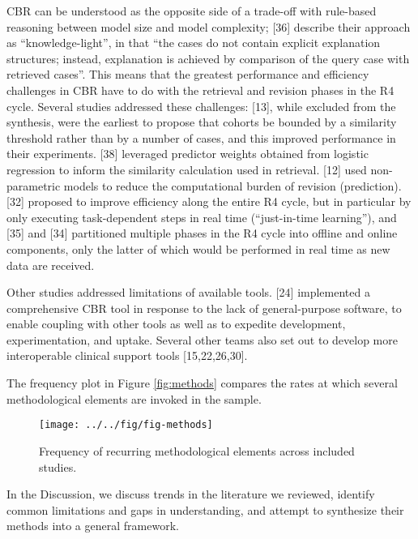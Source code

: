 \documentclass[preprint, 3p,
authoryear]{elsarticle} %
\begin{document}
CBR can be understood as the opposite side of a trade-off with
rule-based reasoning between model size and model complexity; {[}36{]}
describe their approach as ``knowledge-light'', in that ``the cases do
not contain explicit explanation structures; instead, explanation is
achieved by comparison of the query case with retrieved cases''. This
means that the greatest performance and efficiency challenges in CBR
have to do with the retrieval and revision phases in the R4 cycle.
Several studies addressed these challenges: {[}13{]}, while excluded
from the synthesis, were the earliest to propose that cohorts be bounded
by a similarity threshold rather than by a number of cases, and this
improved performance in their experiments. {[}38{]} leveraged predictor
weights obtained from logistic regression to inform the similarity
calculation used in retrieval. {[}12{]} used non-parametric models to
reduce the computational burden of revision (prediction). {[}32{]}
proposed to improve efficiency along the entire R4 cycle, but in
particular by only executing task-dependent steps in real time
(``just-in-time learning''), and {[}35{]} and {[}34{]} partitioned
multiple phases in the R4 cycle into offline and online components, only
the latter of which would be performed in real time as new data are
received.

Other studies addressed limitations of available tools. {[}24{]}
implemented a comprehensive CBR tool in response to the lack of
general-purpose software, to enable coupling with other tools as well as
to expedite development, experimentation, and uptake. Several other
teams also set out to develop more interoperable clinical support tools
{[}15,22,26,30{]}.

The frequency plot in Figure \ref{fig:methods} compares the rates at
which several methodological elements are invoked in the sample.

\begin{figure}

{\centering \texttt{[image: ../../fig/fig-methods]} 

}

\caption{\label{fig:methods}Frequency of recurring methodological elements across included studies.}\label{fig:fig:methods}
\end{figure}

In the Discussion, we discuss trends in the literature we reviewed,
identify common limitations and gaps in understanding, and attempt to
synthesize their methods into a general framework.
\end{document}
